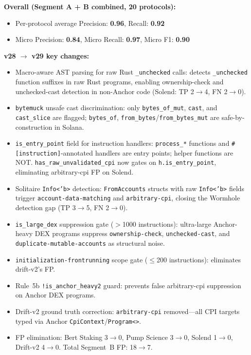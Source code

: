 \documentclass{article}
\begin{document}
\textbf{Overall (Segment A + B combined, 20 protocols):}
\begin{itemize}
  \item Per-protocol average Precision: \textbf{0.96}, Recall: \textbf{0.92}
  \item Micro Precision: \textbf{0.84}, Micro Recall: \textbf{0.97}, Micro F1: \textbf{0.90}
\end{itemize}

\textbf{v28 $\to$ v29 key changes:}
\begin{itemize}
  \item Macro-aware AST parsing for raw Rust \texttt{\_unchecked} calls: detects \texttt{\_unchecked} function suffixes in raw Rust programs, enabling ownership-check and unchecked-cast detection in non-Anchor code (Solend: TP 2$\to$4, FN 2$\to$0).
  \item \texttt{bytemuck} unsafe cast discrimination: only \texttt{bytes\_of\_mut}, \texttt{cast}, and \texttt{cast\_slice} are flagged; \texttt{bytes\_of}, \texttt{from\_bytes}/\texttt{from\_bytes\_mut} are safe-by-construction in Solana.
  \item \texttt{is\_entry\_point} field for instruction handlers: \texttt{process\_*} functions and \texttt{\#[instruction]}-annotated handlers are entry points; helper functions are NOT. \texttt{has\_raw\_unvalidated\_cpi} now gates on \texttt{h.is\_entry\_point}, eliminating arbitrary-cpi FP on Solend.
  \item Solitaire \texttt{Info<'b>} detection: \texttt{FromAccounts} structs with raw \texttt{Info<'b>} fields trigger \texttt{account-data-matching} and \texttt{arbitrary-cpi}, closing the Wormhole detection gap (TP 3$\to$5, FN 2$\to$0).
  \item \texttt{is\_large\_dex} suppression gate ($>$1000 instructions): ultra-large Anchor-heavy DEX programs suppress \texttt{ownership-check}, \texttt{unchecked-cast}, and \texttt{duplicate-mutable-accounts} as structural noise.
  \item \texttt{initialization-frontrunning} scope gate ($\leq$200 instructions): eliminates drift-v2's FP.
  \item Rule~5b \texttt{!is\_anchor\_heavy2} guard: prevents false arbitrary-cpi suppression on Anchor DEX programs.
  \item Drift-v2 ground truth correction: \texttt{arbitrary-cpi} removed---all CPI targets typed via Anchor \texttt{CpiContext}/\texttt{Program<>}.
  \item FP elimination: Bert Staking 3$\to$0, Pump Science 3$\to$0, Solend 1$\to$0, Drift-v2 4$\to$0. Total Segment~B FP: 18$\to$7.
\end{itemize}
\end{document}
